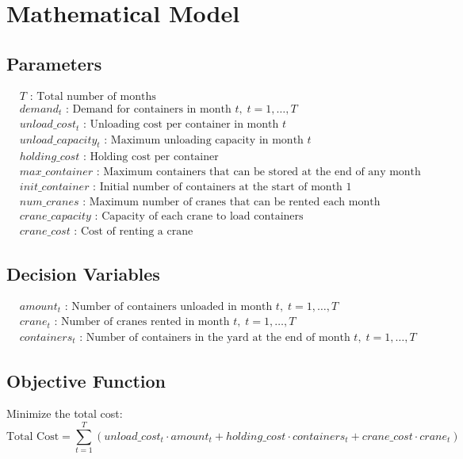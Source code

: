 \documentclass{article}
\begin{document}
\section*{Mathematical Model}

\subsection*{Parameters}
\begin{align*}
& T \text{ : Total number of months} \\
& demand_{t} \text{ : Demand for containers in month } t, \; t = 1, \ldots, T \\
& unload\_cost_{t} \text{ : Unloading cost per container in month } t \\
& unload\_capacity_{t} \text{ : Maximum unloading capacity in month } t \\
& holding\_cost \text{ : Holding cost per container} \\
& max\_container \text{ : Maximum containers that can be stored at the end of any month} \\
& init\_container \text{ : Initial number of containers at the start of month 1} \\
& num\_cranes \text{ : Maximum number of cranes that can be rented each month} \\
& crane\_capacity \text{ : Capacity of each crane to load containers} \\
& crane\_cost \text{ : Cost of renting a crane}
\end{align*}

\subsection*{Decision Variables}
\begin{align*}
& amount_{t} \text{ : Number of containers unloaded in month } t, \; t = 1, \ldots, T \\
& crane_{t} \text{ : Number of cranes rented in month } t, \; t = 1, \ldots, T \\
& containers_{t} \text{ : Number of containers in the yard at the end of month } t, \; t = 1, \ldots, T
\end{align*}

\subsection*{Objective Function}
Minimize the total cost:
\[
\text{Total Cost} = \sum_{t=1}^{T} \left( unload\_cost_{t} \cdot amount_{t} + holding\_cost \cdot containers_{t} + crane\_cost \cdot crane_{t} \right)
\]
\end{document}
